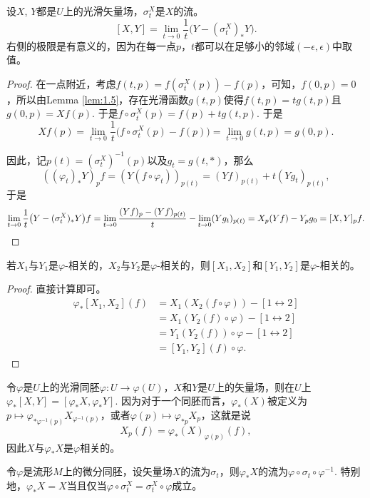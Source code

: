 \begin{pro}\label{pro:3.17}
设$X$, $Y$都是$U$上的光滑矢量场，$\sigma^X_t$是$X$的流。
	\[
		[X,Y]=\lim_{t\to 0}\frac{1}{t}\bigl(Y-(\sigma_t^X)_*Y\bigr).
	\]
右侧的极限是有意义的，因为在每一点$p$，$t$都可以在足够小的邻域$(-\epsilon,\epsilon)$中取值。
\end{pro}

\begin{proof}
	在一点附近，考虑$f(t,p)=f(\sigma^X_t(p))-f(p)$，可知，$f(0,p)=0$，所以由Lemma \ref{lem:1.5}，存在光滑函数$g(t,p)$使得$f(t,p)=tg(t,p)$且$g(0,p)=Xf(p)$. 于是$f\circ \sigma^X_t(p)=f(p)+tg(t,p)$. 于是
	\[
	Xf(p)=\lim_{t\to 0}\frac{1}{t}\bigl(f\circ \sigma^X_t(p)-f(p)\bigr)=\lim_{t\to 0}g(t,p)=g(0,p).
	\]

	因此，记$p(t)=(\sigma^X_t)^{-1}(p)$以及$g_t=g(t,*)$，那么
	\[
	((\varphi_t)_*Y)_p f=(Y(f\circ \varphi_t))_{p(t)}=(Yf)_{p(t)}+t(Yg_t)_{p(t)},
	\]
	于是
	\[
	\lim_{t\to 0}\frac{1}{t}\bigl(Y-(\sigma_t^X)_*Y\bigr)f=\lim_{t\to 0}\frac{(Yf)_p-(Yf)_{p(t)}}{t}-\lim_{t\to 0} (Y g_t)_{p(t)}=X_p(Yf)-Y_pg_0=[X,Y]_pf.\qedhere
	\]
\end{proof}

\begin{lem}\label{lem:3.18}
若$X_1$与$Y_1$是$\varphi$-相关的，$X_2$与$Y_2$是$\varphi$-相关的，则$[X_1,X_2]$和$[Y_1,Y_2]$是$\varphi$-相关的。
\end{lem}

\begin{proof}
直接计算即可。
\begin{align*}
	\varphi_*[X_1,X_2](f)&=X_1(X_2(f\circ \varphi))-[1\leftrightarrow 2]\\
	&=X_1(Y_2(f)\circ\varphi)-[1\leftrightarrow 2]\\
	&=Y_1(Y_2(f))\circ \varphi-[1\leftrightarrow 2]\\
	&=[Y_1,Y_2](f)\circ \varphi.
\end{align*}
\end{proof}

令$\varphi$是$U$上的光滑同胚$\varphi:U\to \varphi(U)$，$X$和$Y$是$U$上的矢量场，则在$U$上$\varphi_{*}[X,Y]=[\varphi_{*}X,\varphi_{*}Y]$. 因为对于一个同胚而言，$\varphi_*(X)$被定义为$p\mapsto \varphi_{*\varphi^{-1}(p)}X_{\varphi^{-1}(p)}$，或者$\varphi(p)\mapsto \varphi_{*p}X_p$，这就是说
\[
	X_p(f)=\varphi_*(X)_{\varphi(p)}(f),
\]
因此$X$与$\varphi_*X$是$\varphi$相关的。

\begin{lem}\label{lem:3.19}
令$\varphi$是流形$M$上的微分同胚，设矢量场$X$的流为$\sigma_t$，则$\varphi_*X$的流为$\varphi\circ \sigma_t\circ\varphi^{-1}$. 特别地，$\varphi_*X=X$当且仅当$\varphi\circ \sigma^X_t=\sigma^X_t\circ \varphi$成立。
\end{lem}

